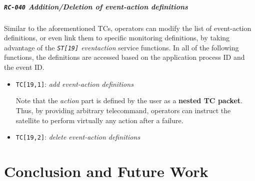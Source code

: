 \documentclass[a4paper,nobib,final]{tufte-book}
\begin{document}
	\paragraph{\textbf{\texttt{RC-040} Addition/Deletion of event-action definitions}}\hspace{0pt}
	
	Similar to the aforementioned \acsp{TC}, operators can modify the list of event-action definitions, or even link them to specific monitoring definitions, by taking advantage of the \emph{\texttt{ST[19]} eventaction} service functions. In all of the following functions, the definitions are accessed based on the application process ID and the event ID.
	

		
	\begin{itemize}
		\item \texttt{TC[19,1]}: \emph{add event-action definitions}
		
		Note that the \emph{action} part is defined by the user as a \textbf{nested \acs{TC} packet}. Thus, by providing arbitrary telecommand, operators can instruct the satellite to perform virtually any action after a failure.
		
		\item \texttt{TC[19,2]}: \emph{delete event-action definitions}
		
	\end{itemize}


\chapter{Conclusion and Future Work}
\label{cap:conclusion}
\end{document}

